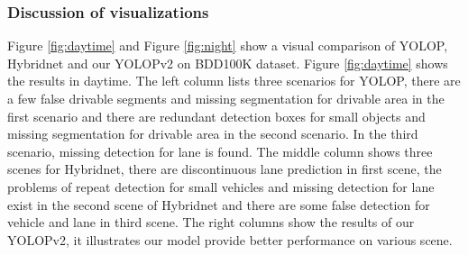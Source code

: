 \documentclass[10pt,twocolumn,letterpaper]{article}
\begin{document}
\begin{table}[htbp]
    \footnotesize
    \begin{center}
    \end{center}
    \caption{Results on lane detection.}
    \label{tab:tab4}
\end{table}

\subsubsection{Discussion of visualizations}
Figure \ref{fig:daytime} and Figure \ref{fig:night} show a visual comparison of YOLOP, Hybridnet and our YOLOPv2 on BDD100K dataset. Figure \ref{fig:daytime} shows the results in daytime. The left column lists three scenarios for YOLOP, there are a few false drivable segments and missing segmentation for drivable area in the first scenario and there are redundant detection boxes for small objects and missing segmentation for drivable area in the second scenario. In the third scenario, missing detection for lane is found. The middle column shows three scenes for Hybridnet, there are discontinuous lane prediction in first scene, the problems of repeat detection for small vehicles and missing detection for lane exist in the second scene of Hybridnet and there are some false detection for vehicle and lane in third scene. The right columns show the results of our YOLOPv2, it illustrates our model provide better performance on various scene.
\end{document}
